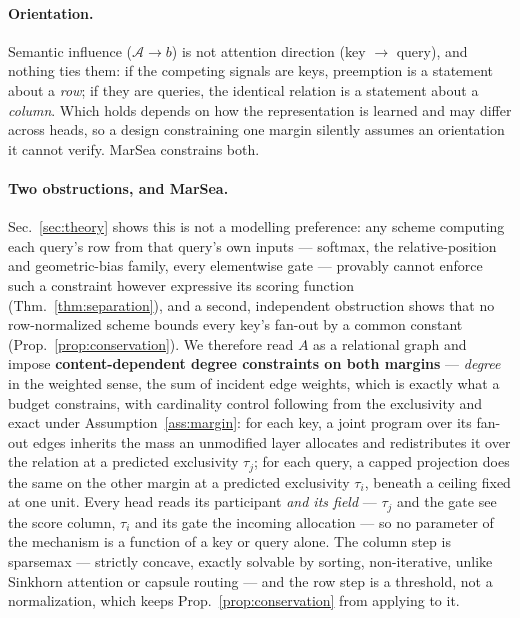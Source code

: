 \documentclass{article}
\begin{document}
\paragraph{Orientation.} Semantic influence ($\mathcal{A}\to b$) is not attention direction
(key $\to$ query), and nothing ties them: if the competing signals are keys, preemption is a
statement about a \emph{row}; if they are queries, the identical relation is a statement about a
\emph{column}. Which holds depends on how the representation is learned and may differ across
heads, so a design constraining one margin silently assumes an orientation it cannot verify.
MarSea constrains both.

\paragraph{Two obstructions, and MarSea.} Sec.~\ref{sec:theory} shows this is not a modelling
preference: any scheme computing each query's row from that query's own inputs --- softmax, the
relative-position and geometric-bias family, every elementwise gate --- provably cannot enforce
such a constraint however expressive its scoring function (Thm.~\ref{thm:separation}), and a
second, independent obstruction shows that no row-normalized scheme bounds every key's fan-out by
a common constant (Prop.~\ref{prop:conservation}). We therefore read $A$ as a relational graph
and impose \textbf{content-dependent degree constraints on both margins} --- \emph{degree} in
the weighted sense, the sum of incident edge weights, which is exactly what a budget constrains,
with cardinality control following from the exclusivity and exact under
Assumption~\ref{ass:margin}: for each key, a joint
program over its fan-out edges inherits the mass an unmodified layer allocates and redistributes
it over the relation at a predicted exclusivity $\tau_j$; for each query, a capped projection
does the same on the other margin at a predicted exclusivity $\tau_i$, beneath a ceiling fixed at
one unit. Every head reads its participant
\emph{and its field} --- $\tau_j$ and the gate see the score column, $\tau_i$ and its gate the
incoming allocation --- so no parameter of the mechanism is a function of a key or query alone.
The column
step is sparsemax \citep{martins2016softmax,peters2019sparse} --- strictly concave, exactly
solvable by sorting, non-iterative, unlike Sinkhorn attention \citep{sander2022sinkformers} or
capsule routing \citep{sabour2017dynamic} --- and the row step is a threshold, not a
normalization, which keeps Prop.~\ref{prop:conservation} from applying to it.
\end{document}
